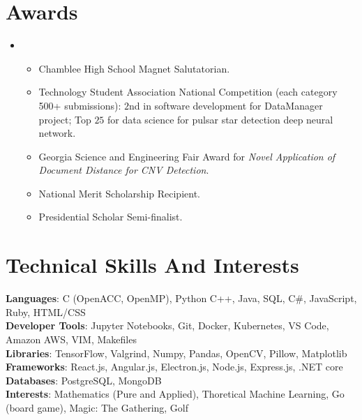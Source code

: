 \documentclass[letterpaper,10pt]{article}
\newcommand{\resumeItem}[1]{

  \item[$\circ$]\small{
    {#1 \vspace{-2pt}}
  }
}
\newcommand{\resumeItemListStart}{\begin{itemize}[rightmargin=1.9cm]}
\newcommand{\resumeItemListEnd}{\end{itemize}\vspace{-5pt}}
\begin{document}
\section{Awards}
\begin{itemize}[leftmargin=0.15in, label={}]
  \item{
              \resumeItemListStart
              \resumeItem{Chamblee High School Magnet Salutatorian.}
              \resumeItem{Technology Student Association National Competition (each category 500+ submissions): $2$nd in software development for DataManager project; Top $25$ for data science for pulsar star detection deep neural network.}
              \resumeItem{Georgia Science and Engineering Fair Award for \textit{Novel Application of Document Distance for CNV Detection}.}
              \resumeItem{National Merit Scholarship Recipient.}
              \resumeItem{Presidential Scholar Semi-finalist.}
              \resumeItemListEnd

        }
  \vspace{3pt}

\end{itemize}
\section{Technical Skills And Interests}
\begin{itemize}[leftmargin=0.15in, label={}]
  \small{\item{
                \textbf{Languages}{: C (OpenACC, OpenMP), Python C++, Java, SQL, C\#, JavaScript, Ruby, HTML/CSS}\\
                \textbf{Developer Tools}{: Jupyter Notebooks, Git, Docker, Kubernetes, VS Code, Amazon AWS, VIM, Makefiles} \\
                \textbf{Libraries}{: TensorFlow, Valgrind, Numpy, Pandas, OpenCV, Pillow, Matplotlib}\\
                \textbf{Frameworks}{: React.js, Angular.js, Electron.js, Node.js, Express.js, .NET core} \\
                \textbf{Databases}{: PostgreSQL, MongoDB}\\
                \textbf{Interests}{: Mathematics (Pure and Applied), Thoretical Machine Learning, Go (board game), Magic: The Gathering, Golf\\
                }}}
\end{itemize}
\end{document}
